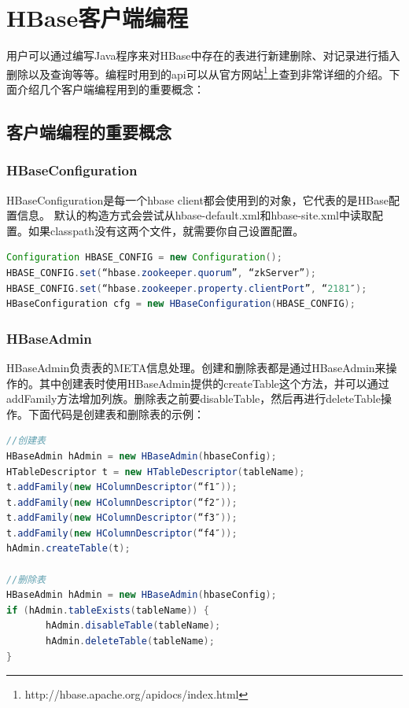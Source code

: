 \chapter{HBase客户端编程}
用户可以通过编写Java程序来对HBase中存在的表进行新建删除、对记录进行插入删除以及查询等等。编程时用到的api可以从官方网站\footnote{http://hbase.apache.org/apidocs/index.html}上查到非常详细的介绍。下面介绍几个客户端编程用到的重要概念：

\section{客户端编程的重要概念}

\subsection{HBaseConfiguration}
HBaseConfiguration是每一个hbase client都会使用到的对象，它代表的是HBase配置信息。
默认的构造方式会尝试从hbase-default.xml和hbase-site.xml中读取配置。如果classpath没有这两个文件，就需要你自己设置配置。
\begin{lstlisting}[language=Java]
Configuration HBASE_CONFIG = new Configuration();
HBASE_CONFIG.set(“hbase.zookeeper.quorum”, “zkServer”);
HBASE_CONFIG.set(“hbase.zookeeper.property.clientPort”, “2181″);
HBaseConfiguration cfg = new HBaseConfiguration(HBASE_CONFIG);
\end{lstlisting}

\subsection{HBaseAdmin}
HBaseAdmin负责表的META信息处理。创建和删除表都是通过HBaseAdmin来操作的。其中创建表时使用HBaseAdmin提供的createTable这个方法，并可以通过addFamily方法增加列族。删除表之前要disableTable，然后再进行deleteTable操作。下面代码是创建表和删除表的示例：

\begin{lstlisting}[language=Java]
//创建表
HBaseAdmin hAdmin = new HBaseAdmin(hbaseConfig);
HTableDescriptor t = new HTableDescriptor(tableName);
t.addFamily(new HColumnDescriptor(“f1″));
t.addFamily(new HColumnDescriptor(“f2″));
t.addFamily(new HColumnDescriptor(“f3″));
t.addFamily(new HColumnDescriptor(“f4″));
hAdmin.createTable(t);

//删除表
HBaseAdmin hAdmin = new HBaseAdmin(hbaseConfig);
if (hAdmin.tableExists(tableName)) {
       hAdmin.disableTable(tableName);
       hAdmin.deleteTable(tableName);
}
\end{lstlisting}

